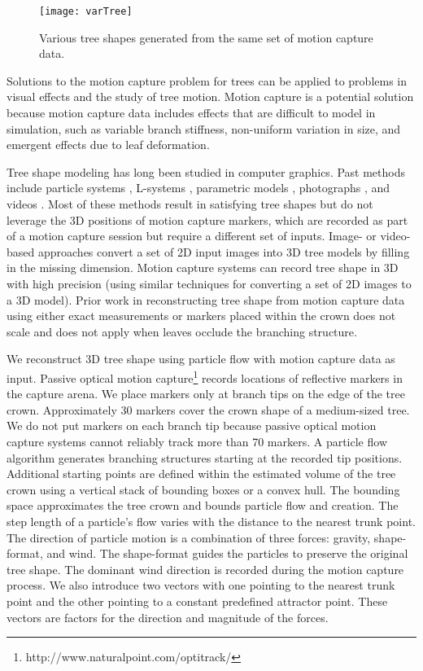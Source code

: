 \begin{figure*}[!t]
\centering
\texttt{[image: varTree]}
\caption{Various tree shapes generated from the same set of motion capture data. }
\label{fig:varTree}
\end{figure*}

Solutions to the motion capture problem for trees can be applied to problems in visual effects and the study of tree motion. Motion capture is a potential solution because motion capture data includes effects that are difficult to model in simulation, such as variable branch stiffness, non-uniform variation in size, and emergent effects due to leaf deformation.

Tree shape modeling has long been studied in computer graphics.  Past methods include particle systems \cite{Reeves83particlesystems,Runions07,palubicki:siggraph09,neubert:acmtg07}, L-systems \cite{lindenmayer68,Lintermann1999,Prusinkiewicz:2001}, parametric models \cite{Weber1995}, photographs \cite{RecheMartinez2004,neubert:acmtg07,Tan:2007:ITM}, and videos \cite{Li:2011:MGM,Diener:2006}. Most of these methods result in satisfying tree shapes but do not leverage the 3D positions of motion capture markers, which are recorded as part of a motion capture session but require a different set of inputs. Image- or video-based approaches convert a set of 2D input images into 3D tree models by filling in the missing dimension.  Motion capture systems can record tree shape in 3D with high precision (using similar techniques for converting a set of 2D images to a 3D model). Prior work in reconstructing tree shape from motion capture data using either exact measurements or markers placed within the crown does not scale and does not apply when leaves occlude the branching structure.

We reconstruct 3D tree shape using particle flow with motion capture data as input. Passive optical motion capture\footnote[1]{http://www.naturalpoint.com/optitrack/} records locations of reflective markers in the capture arena. We place markers only at branch tips on the edge of the tree crown. Approximately 30 markers cover the crown shape of a medium-sized tree. We do not put markers on each branch tip because passive optical motion capture systems cannot reliably track more than 70 markers. A particle flow algorithm generates branching structures starting at the recorded tip positions. Additional starting points are defined within the estimated volume of the tree crown using a vertical stack of bounding boxes or a convex hull. The bounding space approximates the tree crown and bounds particle flow and creation. The step length of a particle's flow varies with the distance to the nearest trunk point. The direction of particle motion is a combination of three forces: gravity, shape-format, and wind. The shape-format guides the particles to preserve the original tree shape. The dominant wind direction is recorded during the motion capture process. We also introduce two vectors with one pointing to the nearest trunk point and the other pointing to a constant predefined attractor point. These vectors are factors for the direction and magnitude of the forces.

